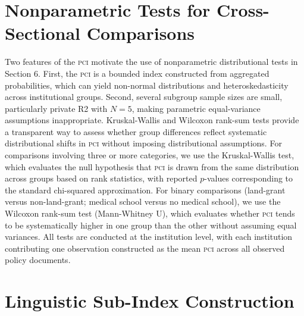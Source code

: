 \documentclass[12pt]{article}
\newcommand{\PCI}{\textsc{pci}}
\begin{document}
\begin{appendices}
\section{Nonparametric Tests for Cross-Sectional Comparisons}
\label{app:tests}

Two features of the \PCI{} motivate the use of nonparametric distributional tests in
Section 6.  First, the \PCI{} is a bounded index constructed from aggregated
probabilities, which can yield non-normal distributions and heteroskedasticity across
institutional groups.  Second, several subgroup sample sizes are small, particularly
private R2 with $N = 5$, making parametric equal-variance assumptions inappropriate.
Kruskal-Wallis and Wilcoxon rank-sum tests provide a transparent way to assess whether
group differences reflect systematic distributional shifts in \PCI{} without imposing
distributional assumptions.  For comparisons involving three or more categories, we
use the Kruskal-Wallis test, which evaluates the null hypothesis that \PCI{} is drawn
from the same distribution across groups based on rank statistics, with reported
$p$-values corresponding to the standard chi-squared approximation.  For binary
comparisons (land-grant versus non-land-grant; medical school versus no medical school),
we use the Wilcoxon rank-sum test (Mann-Whitney U), which evaluates whether \PCI{}
tends to be systematically higher in one group than the other without assuming equal
variances.  All tests are conducted at the institution level, with each institution
contributing one observation constructed as the mean \PCI{} across all observed policy
documents.

\section{Linguistic Sub-Index Construction}
\label{app:subindices}


\end{appendices}
\end{document}

